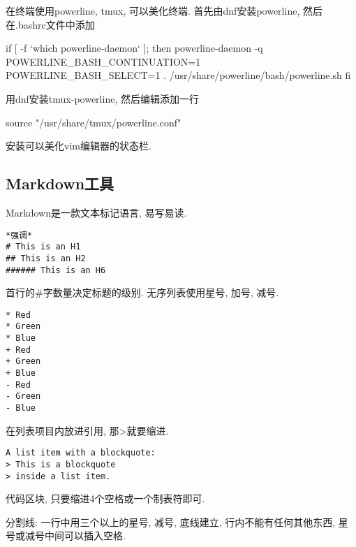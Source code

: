 在终端使用powerline, tmux, 可以美化终端. 首先由dnf安装powerline, 
然后在.bashrc文件中添加
\begin{shell}
if [ -f `which powerline-daemon` ]; then
  powerline-daemon -q
  POWERLINE_BASH_CONTINUATION=1
  POWERLINE_BASH_SELECT=1
  . /usr/share/powerline/bash/powerline.sh
fi
\end{shell}
用dnf安装tmux-powerline, 然后编辑添加一行
\begin{shell}
 source "/usr/share/tmux/powerline.conf"
\end{shell}

安装可以美化vim编辑器的状态栏.

\subsection{Markdown工具}
Markdown是一款文本标记语言, 易写易读. 
\begin{verbatim}
*强调*
# This is an H1
## This is an H2
###### This is an H6
\end{verbatim}
首行的\#字数量决定标题的级别. 无序列表使用星号, 加号, 减号.
\begin{verbatim}
* Red
* Green
* Blue
+ Red
+ Green
+ Blue
- Red
- Green
- Blue
\end{verbatim}
在列表项目内放进引用, 那>就要缩进.
\begin{verbatim}
A list item with a blockquote:
> This is a blockquote
> inside a list item.
\end{verbatim}
代码区块, 只要缩进4个空格或一个制表符即可.

分割线: 一行中用三个以上的星号, 减号, 底线建立, 行内不能有任何其他东西, 星号或减号中间可以插入空格.

